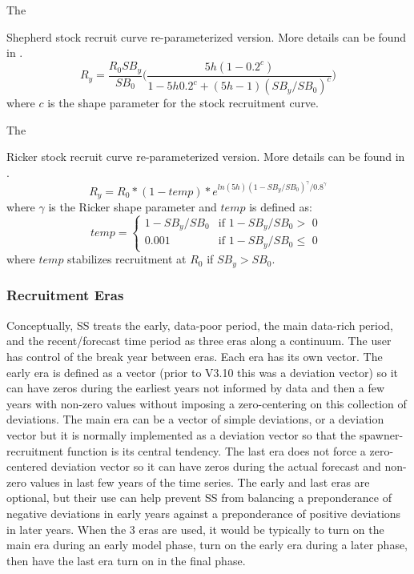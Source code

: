 \hypertarget{Shepherd2}{The} Shepherd stock recruit curve re-parameterized version. More details can be found in \citet{punt_extending_2017}.
	\begin{equation}
		R_y = \frac{R_0SB_y}{SB_0}\bigg(\frac{5h(1-0.2^c)}{1-5h0.2^c+(5h-1)(SB_y/SB_0)^c}\bigg)
	\end{equation}
where $c$ is the shape parameter for the stock recruitment curve.

\hypertarget{Ricker2}{The} Ricker stock recruit curve re-parameterized version. More details can be found in \citet{punt_extending_2017}.
	\begin{equation}
		R_y = R_0*(1-temp)*e^{ln(5h)(1-SB_y/SB_0)^{\gamma}/0.8^{\gamma}}
	\end{equation}
where $\gamma$ is the Ricker shape parameter and $temp$ is defined as:
	\begin{equation}
	temp = 
	\begin{cases}
		1-SB_y/SB_0 & \text{if $1-SB_y/SB_0 >$ 0 }\\
		0.001 & \text{if $1-SB_y/SB_0 \leq$ 0}
	\end{cases}		
	\end{equation}
where $temp$ stabilizes recruitment at $R_0$ if $SB_y > SB_0$. 

\subsubsection{Recruitment Eras}
Conceptually, SS treats the early, data-poor period, the main data-rich period, and the recent/forecast time period as three eras along a continuum. The user has control of the break year between eras.  Each era has its own vector. The early era is defined as a vector (prior to V3.10 this was a deviation vector) so it can have zeros during the earliest years not informed by data and then a few years with non-zero values without imposing a zero-centering on this collection of deviations. The main era can be a vector of simple deviations, or a deviation vector but it is normally implemented as a deviation vector so that the spawner-recruitment function is its central tendency. The last era does not force a zero-centered deviation vector so it can have zeros during the actual forecast and non-zero values in last few years of the time series. The early and last eras are optional, but their use can help prevent SS from balancing a preponderance of negative deviations in early years against a preponderance of positive deviations in later years. When the 3 eras are used, it would be typically to turn on the main era during an early model phase, turn on the early era during a later phase, then have the last era turn on in the final phase.


